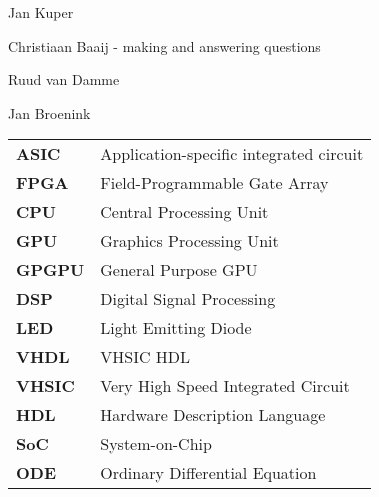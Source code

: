 
\begin{acknowledgements}      
\begin{itemizens}
	\item Jan Kuper	
	\item Christiaan Baaij - making \clash{} and answering questions
	\item Ruud van Damme
	\item Jan Broenink
\end{itemizens}

\end{acknowledgements}



\begin{acronyms}
\begin{tabular}{>{\bfseries}l l}
	ASIC & Application-specific integrated circuit \\
	FPGA & Field-Programmable Gate Array \\
	CPU & Central Processing Unit \\
	GPU & Graphics Processing Unit \\
	GPGPU & General Purpose GPU \\
	DSP & Digital Signal Processing \\
	LED & Light Emitting Diode \\
	VHDL & VHSIC HDL \\
	VHSIC & Very High Speed Integrated Circuit \\
	HDL & Hardware Description Language \\
	SoC & System-on-Chip \\ 
	ODE & Ordinary Differential Equation \\
\end{tabular}		
\end{acronyms}    

  

